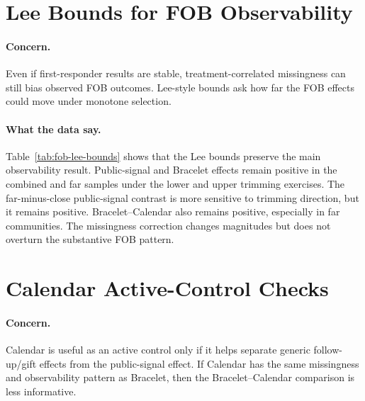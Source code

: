 \documentclass[11pt]{article}
\begin{document}
\section{Lee Bounds for FOB Observability}

\paragraph{Concern.}
Even if first-responder results are stable, treatment-correlated missingness can still bias observed FOB outcomes. Lee-style bounds ask how far the FOB effects could move under monotone selection.

\begin{table}[!htbp]
\centering
\caption{Lee bounds for reduced-form FOB effects}
\label{tab:fob-lee-bounds}

\end{table}
\FloatBarrier

\paragraph{What the data say.}
Table~\ref{tab:fob-lee-bounds} shows that the Lee bounds preserve the main observability result. Public-signal and Bracelet effects remain positive in the combined and far samples under the lower and upper trimming exercises. The far-minus-close public-signal contrast is more sensitive to trimming direction, but it remains positive. Bracelet--Calendar also remains positive, especially in far communities. The missingness correction changes magnitudes but does not overturn the substantive FOB pattern.

\section{Calendar Active-Control Checks}

\paragraph{Concern.}
Calendar is useful as an active control only if it helps separate generic follow-up/gift effects from the public-signal effect. If Calendar has the same missingness and observability pattern as Bracelet, then the Bracelet--Calendar comparison is less informative.

\begin{table}[!htbp]
\centering
\caption{Knowledge-table missingness by treatment assignment}
\label{tab:know-table-attrition-spec}

\end{table}
\end{document}
